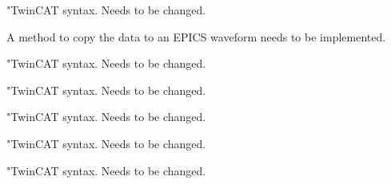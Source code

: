 
\begin{DoxyRefList}
\item[\label{todo__todo000050}%
\hypertarget{todo__todo000050}{}%
Member \hyperlink{ecmcMotion_8h_ade03c844b7a40b99da49b3e8ec996d7d}{axis\-Error\-Reset} (int axis\-Index, int value)]"Twin\-C\-A\-T syntax. Needs to be changed.\par
  
\item[\label{todo__todo000002}%
\hypertarget{todo__todo000002}{}%
Member \hyperlink{ecmcMisc_8h_a5f66c7d4fdf0db73e6cfa81d48368f89}{create\-Data\-Storage} (int index, int elements, int buffer\-Type)]A method to copy the data to an E\-P\-I\-C\-S waveform needs to be implemented.\par
 
\item[\label{todo__todo000020}%
\hypertarget{todo__todo000020}{}%
Member \hyperlink{ecmcMotion_8h_ab053b429d5b632c71bbd28d37c0ab7e7}{get\-Axis\-Acceleration} (int axis\-Index, double $\ast$value)]"Twin\-C\-A\-T syntax. Needs to be changed.\par
  
\item[\label{todo__todo000026}%
\hypertarget{todo__todo000026}{}%
Member \hyperlink{ecmcMotion_8h_aa691b3c375149ae2a637308ec00a82d8}{get\-Axis\-At\-Hard\-Bwd} (int axis\-Index, int $\ast$value)]"Twin\-C\-A\-T syntax. Needs to be changed.\par
  
\item[\label{todo__todo000025}%
\hypertarget{todo__todo000025}{}%
Member \hyperlink{ecmcMotion_8h_a8c2d5f737723ef96da0fa3d71bf5352f}{get\-Axis\-At\-Hard\-Fwd} (int axis\-Index, int $\ast$value)]"Twin\-C\-A\-T syntax. Needs to be changed.\par
  
\item[\label{todo__todo000030}%
\hypertarget{todo__todo000030}{}%
Member \hyperlink{ecmcMotion_8h_a0827d0dfe8d271c010b0346c9f8cd8ec}{get\-Axis\-At\-Home} (int axis\-Index, int $\ast$value)]"Twin\-C\-A\-T syntax. Needs to be changed.\par
  
\item[\label{todo__todo000014}%
\hypertarget{todo__todo000014}{}%
Member \hyperlink{ecmcMotion_8h_a39274ea51d11e382f2096ca328a0793d}{get\-Axis\-Busy} (int axis\-Index, int $\ast$value)]"Twin\-C\-A\-T syntax. Needs to be changed.\par
  

\end{DoxyRefList}
